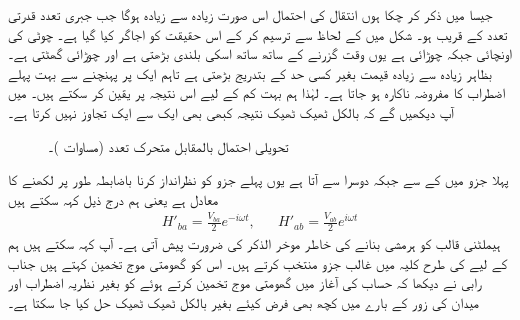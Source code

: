 جیسا میں ذکر کر چکا ہوں انتقال کی احتمال اس صورت زیادہ سے زیادہ ہوگا جب جبری تعدد قدرتی تعدد  کے قریب ہو۔ شکل   میں  کے لحاظ سے  ترسیم کر کے اس حقیقت کو اجاگر کیا گیا ہے۔ چوٹی کی اونچائی  جبکہ چوڑائی  ہے یوں وقت گزرنے کے ساتھ ساتھ اسکی بلندی بڑھتی ہے اور چوڑائی گھٹتی ہے۔ بظاہر زیادہ سے زیادہ قیمت بغیر کسی حد کے بتدریج بڑھتی ہے تاہم ایک پر پہنچنے سے بہت پہلے اضطراب کا مفروضہ ناکارہ  ہو جاتا ہے۔ لہٰذا ہم بہت کم  کے لیے اس نتیجہ پر یقین کر سکتے ہیں۔  میں آپ دیکھیں گے کہ بالکل ٹھیک ٹھیک نتیجہ کبھی بھی ایک سے ایک تجاوز نہیں کرتا ہے۔
\begin{figure}
\centering
{}
\caption{تحویلی احتمال بالمقابل   متحرک  تعدد  (مساوات )۔}
\label{شکل_تابع_وقت_احتمال_جبری_تعدد}
\end{figure}


پہلا جزو  میں  کے  سے جبکہ دوسرا  سے آتا ہے یوں پہلے جزو کو  نظرانداز کرنا باضابطہ طور پر  لکھنے کا معادل ہے یعنی ہم درج ذیل کہہ سکتے ہیں
\begin{align}
	H'_{ba}=\frac{V_{ba}}{2}e^{-i\omega t},&&H'_{ab}=\frac{V_{ab}}{2}e^{i\omega t}
\end{align}
ہیملٹنی قالب کو ہرمشی بنانے کی خاطر موخر الذکر کی ضرورت پیش آتی ہے۔ آپ کہہ سکتے ہیں ہم  کے لیے  کی طرح کلیہ میں غالب جزو  منتخب کرتے  ہیں۔ اس کو گھومتی موج تخمین کہتے ہیں جناب رابی نے دیکھا کہ حساب کی آغاز میں گھومتی موج تخمین کرتے ہوئے  کو بغیر نظریہ اضطراب اور میدان کی زور کے بارے میں کچھ بھی فرض کیئے بغیر بالکل ٹھیک ٹھیک حل کیا جا سکتا ہے۔

